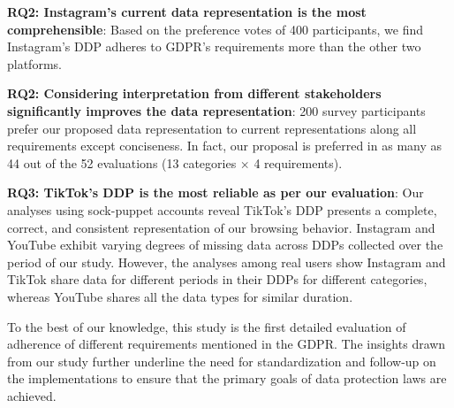 \noindent
\textbf{RQ2: Instagram's current data representation is the most comprehensible}: Based on the preference votes of 400 participants, we find Instagram's DDP adheres to GDPR's requirements more than the other two platforms.  

\noindent
\textbf{RQ2: Considering interpretation from different stakeholders significantly improves the data representation}: 200 survey participants prefer our proposed data representation to current representations along all requirements except conciseness. In fact, our proposal is preferred in as many as 44 out of the 52 evaluations (13 categories $\times$ 4 requirements).  

\noindent
\textbf{RQ3: TikTok's DDP is the most reliable as per our evaluation}: Our analyses using sock-puppet accounts reveal TikTok's DDP presents a complete, correct, and consistent representation of our browsing behavior.
Instagram and YouTube exhibit varying degrees of missing data across DDPs collected over the period of our study.
However, the analyses among real users show Instagram and TikTok share data for different periods in their DDPs for different categories, whereas YouTube shares all the data types for similar duration. 


To the best of our knowledge, this study is the first detailed evaluation 
of adherence of different requirements mentioned in the GDPR. 
The insights drawn from our study further underline the need for standardization and follow-up on the implementations to ensure that the primary goals of data protection laws are achieved.
